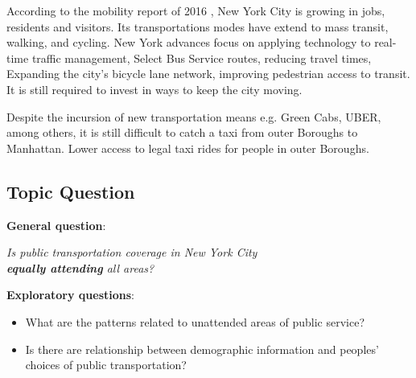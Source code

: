 According to the mobility report of 2016 \cite{mobilityReportNYC2}, New York City is growing in jobs, residents and visitors. Its transportations modes have extend to mass transit, walking, and cycling. New York advances focus on applying technology to real-time traffic management, Select Bus Service routes, reducing travel times, Expanding the city's bicycle lane network, improving pedestrian access to transit. It is still required to invest in ways to keep the city moving. 


Despite the incursion of new transportation means e.g. Green Cabs, UBER, among others, it is still difficult to catch a taxi from outer Boroughs to Manhattan. Lower access to legal taxi rides for people in outer Boroughs.




\subsection{Topic Question}

\textbf{General question}: \\


\begin{tcolorbox}[colback=white,top=6pt,bottom=6pt, breakable,arc=3pt,
  outer arc=3pt]
\begin{center}
 \textit{Is public transportation coverage in New York City \\
\textbf{equally attending} all areas?\\}
\end{center}
\end{tcolorbox}

\vspace{0.5cm}

\textbf{Exploratory questions}: 
\begin{itemize}
\item What are the patterns related to unattended areas of public service?
\item Is there are relationship between demographic information and peoples' choices of public transportation?
\end{itemize}




